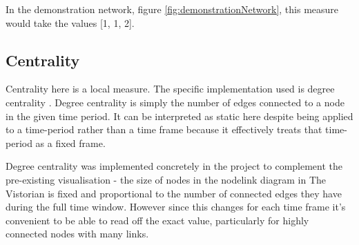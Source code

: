 In the demonstration network, figure \ref{fig:demonstrationNetwork}, this measure would take the values [1, 1, 2]. 


\subsection{Centrality}
Centrality here is a local measure. The specific implementation used is degree centrality \cite{degCent}. Degree centrality is simply the number of edges connected to a node in the given time period. It can be interpreted as static here despite being applied to a time-period rather than a time frame because it effectively treats that time-period as a fixed frame.

Degree centrality was implemented concretely in the project to complement the pre-existing visualisation - the size of nodes in the nodelink diagram in The Vistorian is fixed and proportional to the number of connected edges they have during the full time window. However since this changes for each time frame it's convenient to be able to read off the exact value, particularly for highly connected nodes with many links.




